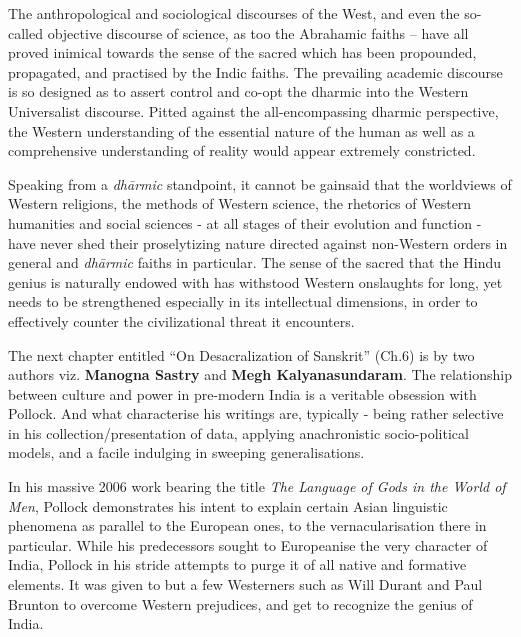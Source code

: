 The anthropological and sociological discourses of the West, and even the so-called objective discourse of science, as too the Abrahamic faiths – have all proved inimical towards the sense of the sacred which has been propounded, propagated, and practised by the Indic faiths. The prevailing academic discourse is so designed as to assert control and co-opt the dharmic into the Western Universalist discourse. Pitted against the all-encompassing dharmic perspective, the Western understanding of the essential nature of the human as well as a comprehensive understanding of reality would appear extremely constricted.

\eject

Speaking from a \textit{dhārmic} standpoint, it cannot be gainsaid that the worldviews of Western religions, the methods of Western science, the rhetorics of Western humanities and social sciences - at all stages of their evolution and function - have never shed their proselytizing nature directed against non-Western orders in general and \textit{dhārmic} faiths in particular. The sense of the sacred that the Hindu genius is naturally endowed with has withstood Western onslaughts for long, yet needs to be strengthened especially in its intellectual dimensions, in order to effectively counter the civilizational threat it encounters.

\vskip 2pt

The next chapter entitled “On Desacralization of Sanskrit” (Ch.6) is by two authors viz. \textbf{Manogna Sastry} and \textbf{Megh Kalyanasundaram}. The relationship between culture and power in pre-modern India is a veritable obsession with Pollock. And what characterise his writings are, typically - being rather selective in his collection/presentation of data, applying anachronistic socio-political models, and a facile indulging in sweeping generalisations.

\vskip 2pt

In his massive 2006 work bearing the title \textit{The Language of Gods in the World of Men}, Pollock demonstrates his intent to explain certain Asian linguistic phenomena as parallel to the European ones, to the vernacularisation there in particular. While his predecessors sought to Europeanise the very character of India, Pollock in his stride attempts to purge it of all native and formative elements. It was given to but a few Westerners such as Will Durant and Paul Brunton to overcome Western prejudices, and get to recognize the genius of India.

